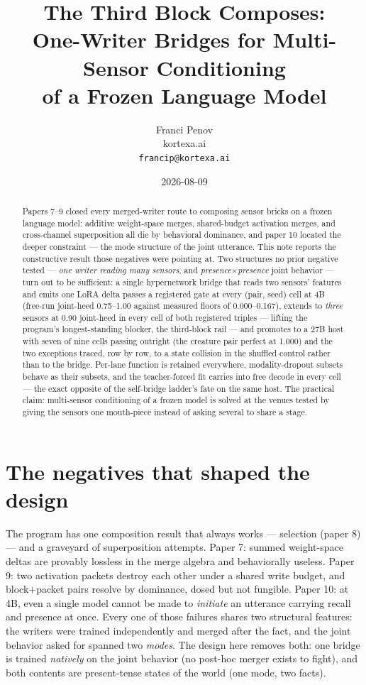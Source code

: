 \documentclass[11pt]{article}
\title{The Third Block Composes:\\One-Writer Bridges for Multi-Sensor Conditioning\\of a Frozen Language Model}
\author{Franci Penov \\ kortexa.ai \\ \texttt{francip@kortexa.ai}}
\date{2026-08-09}
\begin{document}
\maketitle

\begin{abstract}
Papers 7--9 closed every merged-writer route to composing sensor bricks on
a frozen language model: additive weight-space merges, shared-budget
activation merges, and cross-channel superposition all die by behavioral
dominance, and paper 10 located the deeper constraint --- the mode
structure of the joint utterance. This note reports the constructive
result those negatives were pointing at. Two structures no prior negative
tested --- \emph{one writer reading many sensors}, and
\emph{presence$\times$presence} joint behavior --- turn out to be
sufficient: a single hypernetwork bridge that reads two sensors' features
and emits one LoRA delta passes a registered gate at every (pair, seed)
cell at 4B (free-run joint-heed 0.75--1.00 against measured floors of
0.000--0.167), extends to \emph{three} sensors at 0.90 joint-heed in
every cell of both registered triples --- lifting the program's
longest-standing blocker, the third-block rail --- and promotes to a 27B
host with seven of nine cells passing outright (the creature pair perfect
at 1.000) and the two exceptions traced, row by row, to a state collision
in the shuffled control rather than to the bridge. Per-lane function is
retained everywhere, modality-dropout subsets behave as their subsets, and
the teacher-forced fit carries into free decode in every cell --- the
exact opposite of the self-bridge ladder's fate on the same host. The
practical claim: multi-sensor conditioning of a frozen model is solved at
the venues tested by giving the sensors one mouth-piece instead of asking
several to share a stage.
\end{abstract}

\section{The negatives that shaped the design}

The program has one composition result that always works --- selection
(paper 8) --- and a graveyard of superposition attempts. Paper 7: summed
weight-space deltas are provably lossless in the merge algebra and
behaviorally useless. Paper 9: two activation packets destroy each other
under a shared write budget, and block+packet pairs resolve by dominance,
dosed but not fungible. Paper 10: at 4B, even a single model cannot be
made to \emph{initiate} an utterance carrying recall and presence at
once. Every one of those failures shares two structural features: the
writers were trained independently and merged after the fact, and the
joint behavior asked for spanned two \emph{modes}. The design here
removes both: one bridge is trained \emph{natively} on the joint
behavior (no post-hoc merger exists to fight), and both contents are
present-tense states of the world (one mode, two facts).
\end{document}
